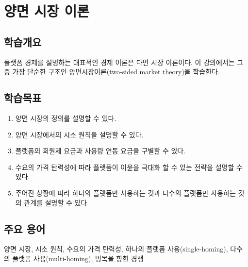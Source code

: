 \chapter{양면 시장 이론}\label{cha:twosidedmarketheory}

\section*{학습개요}
플랫폼 경제를 설명하는 대표적인 경제 이론은 다면 시장 이론이다. 이 강의에서는 그 중 가장 단순한 구조인 양면시장이론(two-sided market theory)을 학습한다.


\section*{학습목표}
\begin{enumerate}
\item 양면 시장의 정의를 설명할 수 있다.
\item 양면 시장에서의 시소 원칙을 설명할 수 있다.
\item 플랫폼의 회원제 요금과 사용량 연동 요금을 구별할 수 있다.
\item 수요의 가격 탄력성에 따라 플랫폼이 이윤을 극대화 할 수 있는 전략을 설명할 수 있다.
\item 주어진 상황에 따라 하나의 플랫폼만 사용하는 것과 다수의 플랫폼만 사용하는 것의 관계를 설명할 수 있다.
\end{enumerate}

\section*{주요 용어}
양면 시장, 시소 원칙, 수요의 가격 탄력성, 하나의 플랫폼 사용(single-homing), 다수의 플랫폼 사용(multi-homing), 병목을 향한 경쟁

\pagebreak

